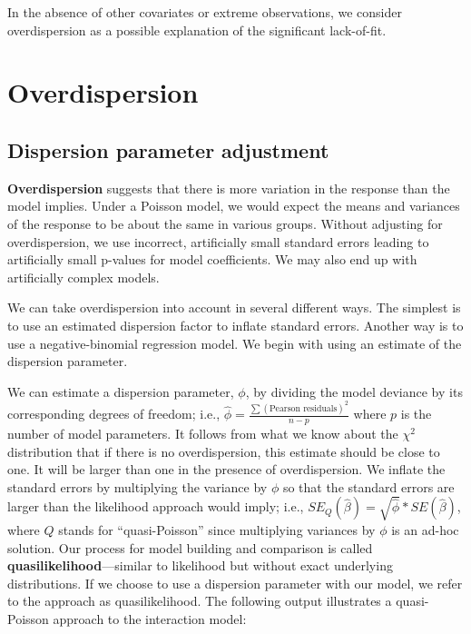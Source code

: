 \documentclass[
]{krantz}
\begin{document}
In the absence of other covariates or extreme observations, we consider overdispersion as a possible explanation of the significant lack-of-fit.

\hypertarget{sec-overdispPois}{%
\section{Overdispersion}\label{sec-overdispPois}}

\hypertarget{dispersion-parameter-adjustment}{%
\subsection{Dispersion parameter adjustment}\label{dispersion-parameter-adjustment}}

\textbf{Overdispersion}  suggests that there is more variation in the response than the model implies. Under a Poisson model, we would expect the means and variances of the response to be about the same in various groups. Without adjusting for overdispersion, we use incorrect, artificially small standard errors leading to artificially small p-values for model coefficients. We may also end up with artificially complex models.

We can take overdispersion into account in several different ways. The simplest is to use an estimated dispersion factor to inflate standard errors. Another way is to use a negative-binomial regression model. We begin with using an estimate of the dispersion parameter.

We can estimate a dispersion parameter, \(\phi\), by dividing the model deviance by its corresponding degrees of freedom; i.e., \(\hat\phi=\frac{\sum(\textrm{Pearson residuals})^2}{n-p}\) where \(p\) is the number of model parameters. It follows from what we know about the \(\chi^2\) distribution that if there is no overdispersion, this estimate should be close to one. It will be larger than one in the presence of overdispersion. We inflate the standard errors by multiplying the variance by \(\phi\) so that the standard errors are larger than the likelihood approach would imply; i.e., \(SE_Q(\hat\beta)=\sqrt{\hat\phi}*SE(\hat\beta)\), where \(Q\) stands for ``quasi-Poisson''  since multiplying variances by \(\phi\) is an ad-hoc solution. Our process for model building and comparison is called \textbf{quasilikelihood}---similar to likelihood but without exact underlying distributions.  If we choose to use a dispersion parameter with our model, we refer to the approach as quasilikelihood. The following output illustrates a quasi-Poisson approach to the interaction model:
\end{document}

